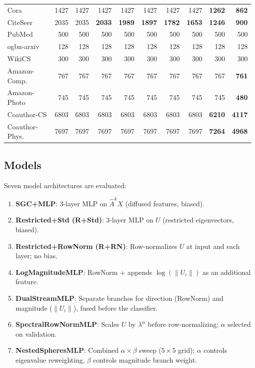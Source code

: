 \documentclass[11pt]{article}
\begin{document}
\begin{table}[H]
\begin{tabular}{lrrrrrrrrr}
\midrule
Cora             & 1427 & 1427 & 1427 & 1427 & 1427 & 1427 & 1427 & \textbf{1262} & \textbf{862}  \\
CiteSeer         & 2035 & 2035 & \textbf{2033} & \textbf{1989} & \textbf{1897} & \textbf{1782} & \textbf{1653} & \textbf{1246} & \textbf{900}  \\
PubMed           & 500  & 500  & 500  & 500  & 500  & 500  & 500  & 500  & 500  \\
ogbn-arxiv       & 128  & 128  & 128  & 128  & 128  & 128  & 128  & 128  & 128  \\
WikiCS           & 300  & 300  & 300  & 300  & 300  & 300  & 300  & 300  & 300  \\
Amazon-Comp.     & 767  & 767  & 767  & 767  & 767  & 767  & 767  & 767  & \textbf{761}  \\
Amazon-Photo     & 745  & 745  & 745  & 745  & 745  & 745  & 745  & 745  & \textbf{480}  \\
Coauthor-CS      & 6803 & 6803 & 6803 & 6803 & 6803 & 6803 & 6803 & \textbf{6210} & \textbf{4117} \\
Coauthor-Phys.   & 7697 & 7697 & 7697 & 7697 & 7697 & 7697 & 7697 & \textbf{7264} & \textbf{4968} \\
\bottomrule
\end{tabular}
\end{table}

\subsection{Models}

Seven model architectures are evaluated:

\begin{enumerate}
  \item \textbf{SGC+MLP}: 3-layer MLP on $\hat{A}^k X$ (diffused features, biased).
  \item \textbf{Restricted+Std (R+Std)}: 3-layer MLP on $U$ (restricted eigenvectors, biased).
  \item \textbf{Restricted+RowNorm (R+RN)}: Row-normalizes $U$ at input and each layer; no bias.
  \item \textbf{LogMagnitudeMLP}: RowNorm + appends $\log(\|U_i\|)$ as an additional feature.
  \item \textbf{DualStreamMLP}: Separate branches for direction (RowNorm) and magnitude ($\|U_i\|$), fused before the classifier.
  \item \textbf{SpectralRowNormMLP}: Scales $U$ by $\lambda^\alpha$ before row-normalizing; $\alpha$ selected on validation.
  \item \textbf{NestedSpheresMLP}: Combined $\alpha{\times}\beta$ sweep ($5{\times}5$ grid); $\alpha$ controls eigenvalue reweighting, $\beta$ controls magnitude branch weight.
\end{enumerate}
\end{document}
